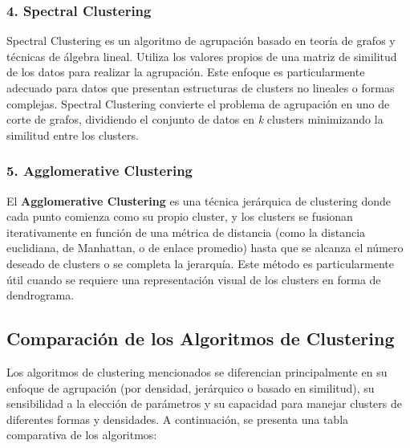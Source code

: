 \subsubsection*{4. Spectral Clustering}

Spectral Clustering es un algoritmo de agrupación basado en teoría de grafos y técnicas de álgebra lineal. Utiliza los valores propios de una matriz de similitud de los datos para realizar la agrupación. Este enfoque es particularmente adecuado para datos que presentan estructuras de clusters no lineales o formas complejas. Spectral Clustering convierte el problema de agrupación en uno de corte de grafos, dividiendo el conjunto de datos en \textit{k} clusters minimizando la similitud entre los clusters.

\subsubsection*{5. Agglomerative Clustering}

El \textbf{Agglomerative Clustering} es una técnica jerárquica de clustering donde cada punto comienza como su propio cluster, y los clusters se fusionan iterativamente en función de una métrica de distancia (como la distancia euclidiana, de Manhattan, o de enlace promedio) hasta que se alcanza el número deseado de clusters o se completa la jerarquía. Este método es particularmente útil cuando se requiere una representación visual de los clusters en forma de dendrograma.

\subsection*{Comparación de los Algoritmos de Clustering}

Los algoritmos de clustering mencionados se diferencian principalmente en su enfoque de agrupación (por densidad, jerárquico o basado en similitud), su sensibilidad a la elección de parámetros y su capacidad para manejar clusters de diferentes formas y densidades. A continuación, se presenta una tabla comparativa de los algoritmos:

